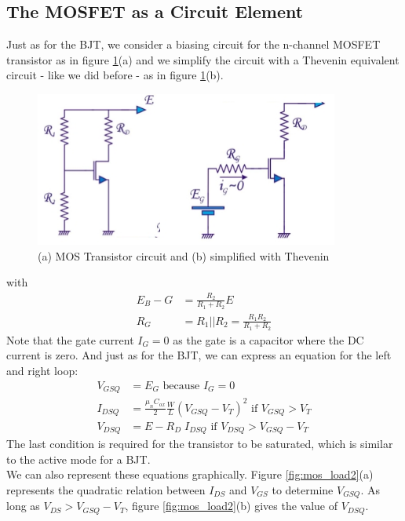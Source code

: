 \subsection{The MOSFET as a Circuit Element}
Just as for the BJT, we consider a biasing circuit for the n-channel MOSFET transistor as in figure \ref{fig:mos_load1}(a) and we simplify the circuit with a Thevenin equivalent circuit - like we did before - as in figure \ref{fig:mos_load1}(b).
\begin{figure}[h!]
	\centering
	\includegraphics[width=10cm]{figures/ch02/mos_load1.jpg}
	\caption{(a) MOS Transistor circuit and (b) simplified with Thevenin} 
	\label{fig:mos_load1}
\end{figure}
with 
\begin{equation}
	\begin{split}
		E_B-G &= \frac{R_2}{R_1 + R_2} E \\
		R_G &= R_1 || R_2 = \frac{R_1 R_2}{R_1 + R_2}
	\end{split}
\end{equation}
Note that the gate current $I_G = 0$ as the gate is a capacitor where the DC current is zero. And just as for the BJT, we can express an equation for the left and right loop:
\begin{equation}
	\begin{split}
		V_{GSQ} &= E_G \text{ because } I_{G} = 0\\
		I_{DSQ} &= \frac{\mu_n C_{ox}}{2} \frac{W}{L} (V_{GSQ} - V_T)^2 \text{ if } V_{GSQ} > V_T\\
		V_{DSQ} &= E - R_D \; I_{DSQ} \text{ if } V_{DSQ} > V_{GSQ} - V_T
	\end{split}
\end{equation}
 The last condition is required for the transistor to be saturated, which is similar to the active mode for a BJT.\\
 We can also represent these equations graphically. Figure \ref{fig:mos_load2}(a) represents the quadratic relation between $I_{DS}$ and $V_{GS}$ to determine $V_{GSQ}$. As long as $V_{DS} > V_{GSQ} - V_T$, figure \ref{fig:mos_load2}(b) gives the value of $V_{DSQ}$.
